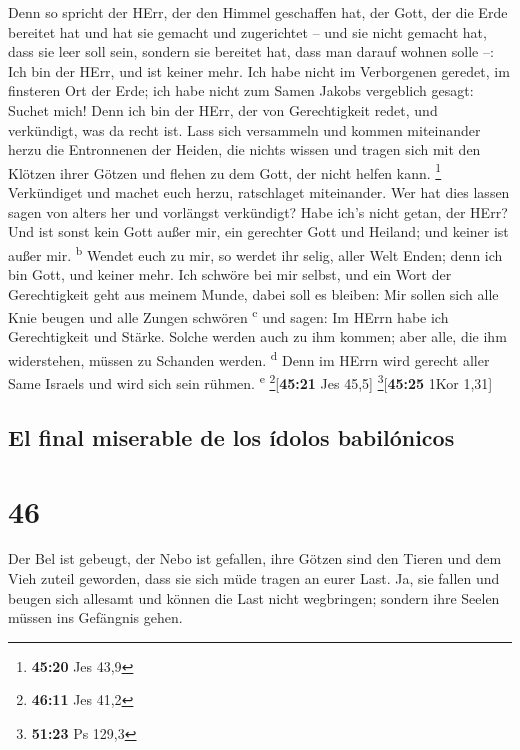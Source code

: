  Denn so spricht der HErr, der den Himmel geschaffen hat,
der Gott, der die Erde bereitet hat und hat sie gemacht und zugerichtet
-- und sie nicht gemacht hat, dass sie leer soll sein, sondern sie
bereitet hat, dass man darauf wohnen solle --: Ich bin der HErr, und ist
keiner mehr.  Ich habe nicht im Verborgenen geredet, im
finsteren Ort der Erde; ich habe nicht zum Samen Jakobs vergeblich
gesagt: Suchet mich! Denn ich bin der HErr, der von Gerechtigkeit redet,
und verkündigt, was da recht ist.  Lass sich versammeln
und kommen miteinander herzu die Entronnenen der Heiden, die nichts
wissen und tragen sich mit den Klötzen ihrer Götzen und flehen zu dem
Gott, der nicht helfen kann. \footnote{\textbf{45:20} Jes 43,9}
 Verkündiget und machet euch herzu, ratschlaget
miteinander. Wer hat dies lassen sagen von alters her und vorlängst
verkündigt? Habe ich's nicht getan, der HErr? Und ist sonst kein Gott
außer mir, ein gerechter Gott und Heiland; und keiner ist außer mir.
\textsuperscript{b}  Wendet euch zu mir, so werdet ihr
selig, aller Welt Enden; denn ich bin Gott, und keiner mehr.
 Ich schwöre bei mir selbst, und ein Wort der
Gerechtigkeit geht aus meinem Munde, dabei soll es bleiben: Mir sollen
sich alle Knie beugen und alle Zungen schwören \textsuperscript{c}
 und sagen: Im HErrn habe ich Gerechtigkeit und Stärke.
Solche werden auch zu ihm kommen; aber alle, die ihm widerstehen, müssen
zu Schanden werden. \textsuperscript{d}  Denn im HErrn
wird gerecht aller Same Israels und wird sich sein rühmen.
\textsuperscript{e} \footnote{\textbf{46:11} Jes 41,2}{[}\textbf{45:21}
Jes 45,5{]} \footnote{\textbf{51:23} Ps 129,3}{[}\textbf{45:25} 1Kor
1,31{]}

\hypertarget{el-final-miserable-de-los-uxeddolos-babiluxf3nicos}{%
\subsection{El final miserable de los ídolos
babilónicos}\label{el-final-miserable-de-los-uxeddolos-babiluxf3nicos}}

\hypertarget{section-45}{%
\section{46}\label{section-45}}

 Der Bel ist gebeugt, der Nebo ist gefallen, ihre Götzen
sind den Tieren und dem Vieh zuteil geworden, dass sie sich müde tragen
an eurer Last.  Ja, sie fallen und beugen sich allesamt
und können die Last nicht wegbringen; sondern ihre Seelen müssen ins
Gefängnis gehen.

